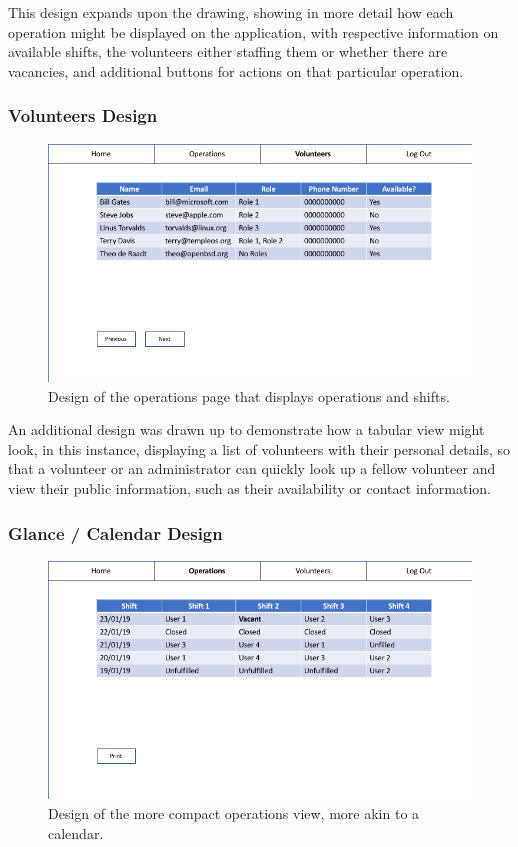 This design expands upon the drawing, showing in more detail how each operation might be displayed on the application, with respective information on available shifts, the volunteers either staffing them or whether there are vacancies, and additional buttons for actions on that particular operation.

\subsubsection{Volunteers Design}
\begin{figure}[!ht]
    \includegraphics[width=1.0\textwidth]{Figures/design-volunteers}
    \caption{Design of the operations page that displays operations and shifts.}
    \label{fig:volunteers}
\end{figure}

An additional design was drawn up to demonstrate how a tabular view might look, in this instance, displaying a list of volunteers with their personal details, so that a volunteer or an administrator can quickly look up a fellow volunteer and view their public information, such as their availability or contact information.

\subsubsection{Glance / Calendar Design}
\begin{figure}[!ht]
    \includegraphics[width=1.0\textwidth]{Figures/design-glance}
    \caption{Design of the more compact operations view, more akin to a calendar.}
    \label{fig:glance}
\end{figure}

